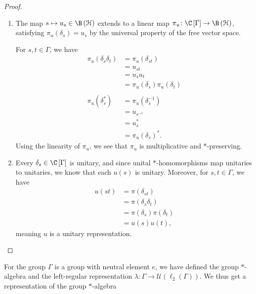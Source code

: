 \documentclass[10pt]{mypackage}
\begin{document}
\begin{proof}\hfill
  \begin{enumerate}[(1)]
    \item The map $s\mapsto u_s\in \B\left(\mathcal{H}\right)$ extends to a linear map $\pi_u\colon \C\left[\Gamma\right]\rightarrow \B\left(\mathcal{H}\right)$, satisfying $\pi_u\left(\delta_s\right) = u_s$ by the universal property of the free vector space.\newline

      For $s,t\in \Gamma$, we have
      \begin{align*}
        \pi_u\left(\delta_s\delta_t\right) &= \pi_u\left(\delta_{st}\right)\\
                                           &= u_{st}\\
                                           &= u_su_t\\
                                           &= \pi_u\left(\delta_s\right)\pi_u\left(\delta_t\right)\\
                                           \\
        \pi_u\left(\delta_s^{\ast}\right) &= \pi_u\left(\delta_{s}^{-1}\right)\\
                                          &= u_{s^{-1}}\\
                                          &= u_{s}^{\ast}\\
                                          &= \pi_u\left(\delta_s\right)^{\ast}.
      \end{align*}
      Using the linearity of $\pi_u$, we see that $\pi_u$ is multiplicative and $\ast$-preserving.
    \item Every $\delta_s\in \C\left[\Gamma\right]$ is unitary, and since unital $\ast$-homomorphisms map unitaries to unitaries, we know that each $u(s)$ is unitary. Moreover, for $s,t\in \Gamma$, we have
      \begin{align*}
        u\left(st\right) &= \pi\left(\delta_{st}\right)\\
                         &= \pi\left(\delta_s\delta_t\right)\\
                         &= \pi\left(\delta_s\right)\pi\left(\delta_t\right)\\
                         &= u(s)u(t),
      \end{align*}
      meaning $u$ is a unitary representation.
  \end{enumerate}
\end{proof}
For the group $\Gamma$ is a group with neutral element $e$, we have defined the group $\ast$-algebra and the left-regular representation $\lambda\colon \Gamma\rightarrow \mathcal{U}\left(\ell_2\left(\Gamma\right)\right)$. We thus get a representation of the group $\ast$-algebra
\end{document}

